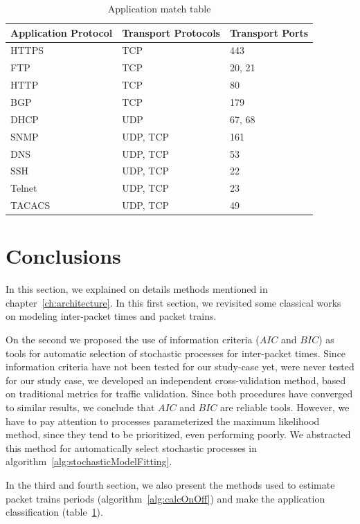 \begin{table}[ht!]
    \centering
    \caption{Application match table}
    \label{tab:application-protocols}
    \begin{tabular}{lll}
        \hline
        Application Protocol & Transport Protocols & Transport Ports \\ \hline
        \acrfull{HTTPS}               & TCP                & 443             \\
        FTP                 & TCP                & 20, 21          \\
        HTTP                & TCP                & 80              \\
        \acrfull{BGP}                 & TCP                & 179             \\
        \acrfull{DHCP}                & UDP                & 67, 68          \\
        \acrfull{SNMP}                & UDP, TCP           & 161             \\
        \acrfull{DNS}                 & UDP, TCP           & 53              \\
        \acrfull{SSH}                 & UDP, TCP           & 22              \\
        Telnet              & UDP, TCP           & 23              \\
        \acrfull{TACACS}              & UDP, TCP           & 49              \\ \hline
    \end{tabular}
\end{table}


\section{Conclusions}


In this section, we explained on details methods mentioned in chapter~\ref{ch:architecture}. 
In this first section,  we revisited some classical works on modeling inter-packet times and packet trains. 

On the second we proposed the use of information criteria ($AIC$ and $BIC$) as tools for automatic selection of stochastic processes for inter-packet times. Since information criteria have not been tested for our study-case yet, were never tested for our study case, we developed an independent cross-validation method, based on traditional metrics for traffic validation. Since both procedures have converged to similar results, we conclude that $AIC$ and $BIC$ are reliable tools. However, we have to pay attention to processes parameterized the maximum likelihood method, since they tend to be prioritized, even performing poorly.  We abstracted this method for automatically select stochastic processes in algorithm~\ref{alg:stochasticModelFitting}. 

In the third and fourth section, we also present the methods used to estimate packet trains periods (algorithm~\ref{alg:calcOnOff}) and make the application classification (table~\ref{tab:application-protocols}). 
